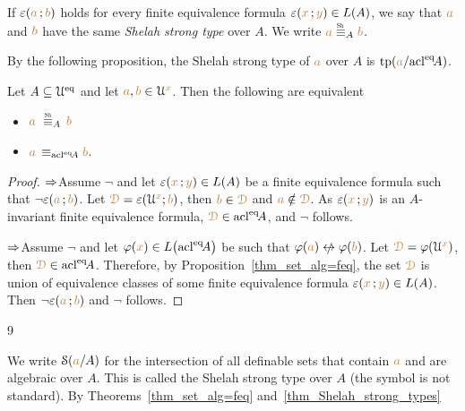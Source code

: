 \begin{definition}\label{def_Sh_strong_type}
  If $\varepsilon({\color{brown} a}\,;{\color{brown} b})$ holds for every finite equivalence formula $\varepsilon({\color{brown} x}\,;{\color{brown} y})\in L(A)$, we say that ${\color{brown} a}$ and ${\color{brown} b}$ have the same \emph{Shelah strong type\/} over $A$.
  We write \emph{${\mr a}\stackrel{\scalebox{.5}{\rm Sh}}{\equiv}_A{\mr b}$.}
\end{definition}

By the following proposition, the Shelah strong type of ${\color{brown} a}$ over $A$ is ${\rm tp}({\color{brown} a}/{\rm acl}^{{\rm eq}}\!A)$.

\begin{theorem}\label{thm_Shelah_strong_types}
Let $A\subseteq\EuScript U^{{\rm eq}}$ and let ${\color{brown} a},{\color{brown} b}\in\EuScript U^{\color{brown} x}$.
Then the following are equivalent\nobreak
\begin{itemize}
\item[1.]  ${\mr a}\ \equivSh_A\, {\mr b}$
\item[2.]  ${\color{brown} a}\,\equiv_{{\rm acl}^{{\rm eq}}\! A}{\color{brown} b}$.
\end{itemize} 
\end{theorem}
\begin{proof}
$\Rightarrow$\quad Assume $\neg$ and let $\varepsilon({\color{brown} x}\,;{\color{brown} y})\in L(A)$ be a finite equivalence formula such that $\neg\varepsilon({\color{brown} a}\,;{\color{brown} b})$.
Let ${\color{brown}\EuScript D}=\varepsilon(\EuScript U^{\color{brown} x};{\color{brown} b})$, then  ${\color{brown} b}\in{\color{brown}\EuScript D}$ and ${\color{brown} a}\notin{\color{brown}\EuScript D}$.
As $\varepsilon({\color{brown} x}\,;{\color{brown} y})$ is an $A$-invariant finite equivalence formula, ${\color{brown}\EuScript D}\in{\rm acl}^{{\rm eq}}\!A$, and $\neg$ follows.

$\Rightarrow$\quad Assume $\neg$ and let $\varphi({\color{brown} x})\in L\big({\rm acl}^{{\rm eq}}\!A\big)$ be  such that $\phi({\mr a})\niff\phi({\mr b})$.
Let ${\color{brown}\EuScript D}=\varphi(\EuScript U^{\color{brown} x})$, then ${\color{brown}\EuScript D}\in{\rm acl}^{{\rm eq}}\!A$.
Therefore, by Proposition~\ref{thm_set_alg=feq}, the set ${\color{brown}\EuScript D}$ is union of equivalence classes of some finite equivalence formula $\varepsilon({\color{brown} x}\,;{\color{brown} y})\in L(A)$.
Then $\neg\varepsilon({\color{brown} a}\,;{\color{brown} b})$ and $\neg$ follows.
\end{proof}9

We write \emph{$\EuScript S({\color{brown} a}/A)$\/} for the intersection of all definable sets that contain ${\color{brown} a}$ and are algebraic over $A$.
This is called the Shelah strong type over $A$ (the symbol is not standard).
By Theorems~\ref{thm_set_alg=feq} and~\ref{thm_Shelah_strong_types} 


